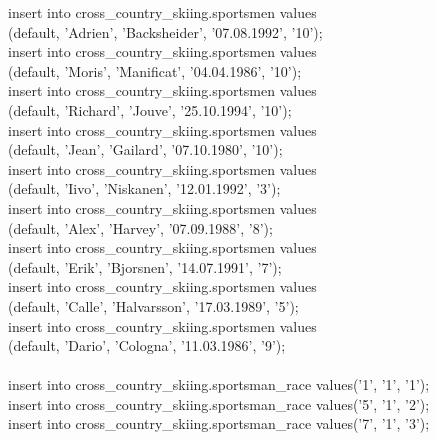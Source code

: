 \documentclass[a4paper,12pt]{article}
\begin{document}
insert into cross\_country\_skiing.sportsmen values \\
\indent \indent \indent \indent \indent \indent \indent (default, 'Adrien',  'Backsheider', '07.08.1992',  '10');\\
insert into cross\_country\_skiing.sportsmen values \\
\indent \indent \indent \indent \indent \indent \indent (default, 'Moris', 'Manificat', '04.04.1986',  '10');\\
insert into cross\_country\_skiing.sportsmen values \\
\indent \indent \indent \indent \indent \indent \indent (default, 'Richard', 'Jouve', '25.10.1994',  '10');\\
insert into cross\_country\_skiing.sportsmen values \\
\indent \indent \indent \indent \indent \indent \indent (default, 'Jean',  'Gailard', '07.10.1980',  '10');\\
insert into cross\_country\_skiing.sportsmen values \\
\indent \indent \indent \indent \indent \indent \indent (default, 'Iivo',  'Niskanen',  '12.01.1992',  '3');\\
insert into cross\_country\_skiing.sportsmen values \\
\indent \indent \indent \indent \indent \indent \indent (default, 'Alex',  'Harvey',  '07.09.1988',  '8');\\
insert into cross\_country\_skiing.sportsmen values \\
\indent \indent \indent \indent \indent \indent \indent (default, 'Erik',  'Bjorsnen',  '14.07.1991',  '7');\\
insert into cross\_country\_skiing.sportsmen values \\
\indent \indent \indent \indent \indent \indent \indent (default, 'Calle', 'Halvarsson',  '17.03.1989',  '5');\\
insert into cross\_country\_skiing.sportsmen values \\
\indent \indent \indent \indent \indent \indent \indent (default, 'Dario', 'Cologna', '11.03.1986',  '9');\\
\\
insert into cross\_country\_skiing.sportsman\_race values('1',  '1', '1');\\
insert into cross\_country\_skiing.sportsman\_race values('5',  '1', '2');\\
insert into cross\_country\_skiing.sportsman\_race values('7',  '1', '3');\\
\end{document}
